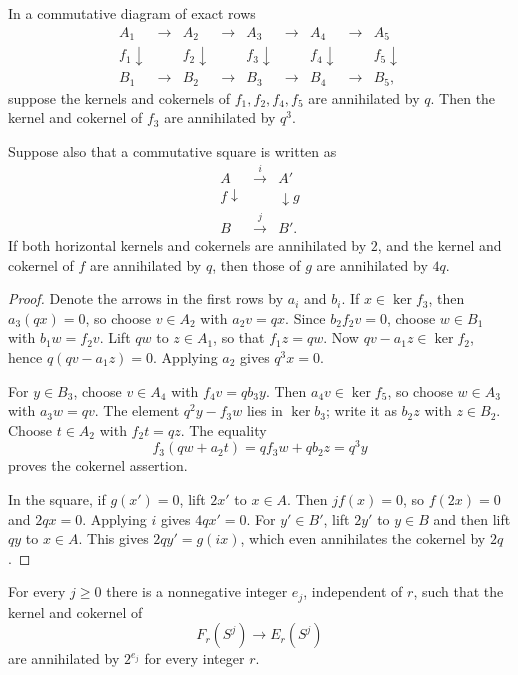 \begin{lemma}
\label{lat:finite-chases}
In a commutative diagram of exact rows
\[
\begin{array}{ccccccccc}
 A_1&\longrightarrow&A_2&\longrightarrow&A_3&\longrightarrow&A_4&\longrightarrow&A_5\\
 {\scriptstyle f_1}\downarrow&&{\scriptstyle f_2}\downarrow&&
 {\scriptstyle f_3}\downarrow&&{\scriptstyle f_4}\downarrow&&
 {\scriptstyle f_5}\downarrow\\
 B_1&\longrightarrow&B_2&\longrightarrow&B_3&\longrightarrow&B_4&\longrightarrow&B_5,
\end{array}
\]
suppose the kernels and cokernels of $f_1,f_2,f_4,f_5$ are annihilated
by $q$.  Then the kernel and cokernel of $f_3$ are annihilated by $q^3$.

Suppose also that a commutative square is written as
\[
\begin{array}{ccc}
 A&\xrightarrow{i}&A'\\
 {\scriptstyle f}\downarrow&&\downarrow{\scriptstyle g}\\
 B&\xrightarrow{j}&B'.
\end{array}
\]
If both horizontal kernels and cokernels are annihilated by $2$, and
the kernel and cokernel of $f$ are annihilated by $q$, then those of
$g$ are annihilated by $4q$.
\end{lemma}

\begin{proof}
Denote the arrows in the first rows by $a_i$ and $b_i$.
If $x\in\ker f_3$, then $a_3(qx)=0$, so choose $v\in A_2$ with
$a_2v=qx$.  Since $b_2f_2v=0$, choose $w\in B_1$ with
$b_1w=f_2v$.  Lift $qw$ to $z\in A_1$, so that $f_1z=qw$.
Now $qv-a_1z\in\ker f_2$, hence $q(qv-a_1z)=0$.  Applying $a_2$
gives $q^3x=0$.

For $y\in B_3$, choose $v\in A_4$ with $f_4v=q b_3y$.
Then $a_4v\in\ker f_5$, so choose $w\in A_3$ with $a_3w=qv$.
The element $q^2y-f_3w$ lies in $\ker b_3$; write it as $b_2z$
with $z\in B_2$.  Choose $t\in A_2$ with $f_2t=qz$.  The equality
\[
 f_3(qw+a_2t)=qf_3w+qb_2z=q^3y
\]
proves the cokernel assertion.

In the square, if $g(x')=0$, lift $2x'$ to $x\in A$.  Then
$jf(x)=0$, so $f(2x)=0$ and $2qx=0$.  Applying $i$ gives
$4qx'=0$.  For $y'\in B'$, lift $2y'$ to $y\in B$ and then lift
$qy$ to $x\in A$.  This gives $2qy'=g(ix)$, which even annihilates
the cokernel by $2q$.
\end{proof}

\begin{samepage}
\begin{theorem}
\label{thm:bounded-comparison}
For every $j\ge0$ there is a nonnegative integer $e_j$, independent
of $r$, such that the kernel and cokernel of
\[
 F_r(S^j)\longrightarrow E_r(S^j)
\]
are annihilated by $2^{e_j}$ for every integer $r$.
\end{theorem}
\end{samepage}


